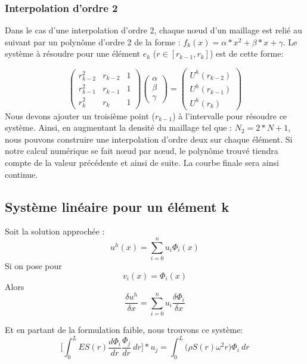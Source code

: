 \documentclass[a4paper,10pt]{report} %
\begin{document}
\subsubsection{Interpolation d'ordre 2}

Dans le cas d'une interpolation d'ordre 2, chaque nœud d'un maillage est relié au suivant par un polynôme d'ordre 2 de la forme : $f_{k}(x)=\alpha*x^2+\beta*x+\gamma$. Le système à résoudre pour une élément $e_k$ ($r\in[r_{k-1},r_{k}]$) est de cette forme:

\begin{equation}
\begin{pmatrix}
r_{k-2}^2 & r_{k-2} & 1 \\
r_{k-1}^2 & r_{k-1} & 1 \\
r_{k}^2 & r_{k} & 1 
\end{pmatrix}
\begin{pmatrix}
\alpha \\
\beta \\
\gamma
\end{pmatrix}
=
\begin{pmatrix}
U^h(r_{k-2}) \\
U^h(r_{k-1}) \\
U^h(r_{k})
\end{pmatrix}
\end{equation}
Nous devons ajouter un troisième point ($r_{k-1}$) à l'intervalle pour résoudre ce système. Ainsi, en augmentant la densité du maillage tel que : $N_2=2*N+1$, nous pouvons construire une interpolation d'ordre deux sur chaque élément. Si notre calcul numérique se fait nœud par nœud, le polynôme trouvé tiendra compte de la valeur précédente et ainsi de suite. La courbe finale sera ainsi continue.

\subsection{Système linéaire pour un élément k}

Soit la solution approchée :
$$u^{h}(x)=\sum_{i=0}^{n}u_{i}\Phi_{i}(x)$$
Si on pose pour $$v_i(x)=\Phi_{i}(x)$$ Alors $$\frac{\delta u^h}{\delta x}=\sum_{i=0}^{n}u_{i}\frac{\delta \Phi_{i}}{\delta x}$$ 

Et en partant de la formulation faible, nous trouvons ce système:
\begin{equation}
	\Big[ \int_0^L \!ES(r)\frac{d\Phi_{i}}{dr}\frac{\Phi_{j}}{dr}~dr \Big]*u_j=\int_0^L \! \big(\rho S(r)\omega^2r\big)\Phi_{i}~dr
	\label{eqsys}
\end{equation}
\end{document}
